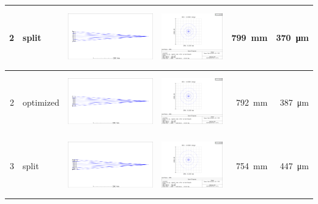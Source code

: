 \documentclass[10pt]{article}
\begin{document}
\begin{table}[h!]
\begin{tabular}{|r|l|c|c|r|r|}
		2 & split & \includegraphics[trim={0.1cm 10cm 40cm 10cm}, clip,height=2.5cm]{../zemax/2_twoElement/1_initial/layout.png} & 
		\includegraphics[trim={7.1cm 8.5cm 12cm 2.6cm}, clip,height=2.5cm]{../zemax/2_twoElement/1_initial/spot.png} & \SI{799}{\milli \meter} &  \SI{370}{\micro \meter} \\\hline
		2 & optimized & \includegraphics[trim={0.25cm 10cm 40cm 10cm}, clip,height=2.5cm]{../zemax/2_twoElement/2_optimize_RMS/layout.png} & 
		\includegraphics[trim={7.1cm 8.5cm 12cm 2.6cm}, clip,height=2.5cm]{../zemax/2_twoElement/2_optimize_RMS/spot.png} & \SI{792}{\milli \meter} &  \SI{387}{\micro \meter} \\\hline
		3 & split & \includegraphics[trim={0.25cm 10cm 40cm 10cm}, clip,height=2.5cm]{../zemax/3_threeElement/1_initial/layout.png} & 
		\includegraphics[trim={7.1cm 8.5cm 12cm 2.6cm}, clip,height=2.5cm]{../zemax/3_threeElement/1_initial/spot.png} & \SI{754}{\milli \meter} &  \SI{447}{\micro \meter} \\\hline

\end{tabular}
\end{table}
\end{document}
